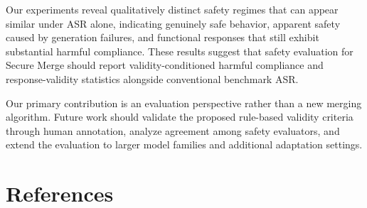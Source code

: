 \documentclass{article}
\begin{document}
Our experiments reveal qualitatively distinct safety regimes that can appear similar under ASR alone, indicating genuinely safe behavior, apparent safety caused by generation failures, and functional responses that still exhibit substantial harmful compliance. These results suggest that safety evaluation for Secure Merge should report validity-conditioned harmful compliance and response-validity statistics alongside conventional benchmark ASR.

Our primary contribution is an evaluation perspective rather than a new merging algorithm. Future work should validate the proposed rule-based validity criteria through human annotation, analyze agreement among safety evaluators, and extend the evaluation to larger model families and additional adaptation settings.




\section*{References}
\small


\newpage
\appendix



\clearpage


\newpage


\end{document}
